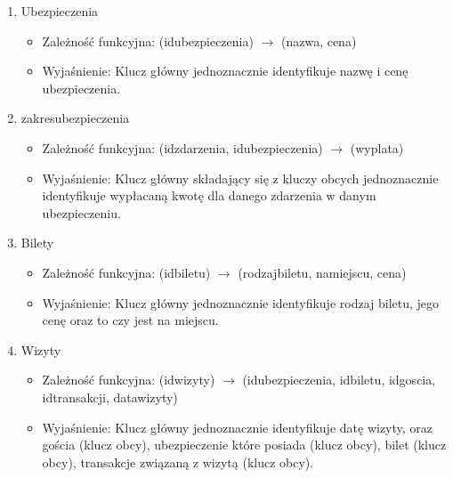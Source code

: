 \documentclass{article}
\begin{document}
\begin{enumerate}
\begin{itemize}
    Klucz główny jednoznacznie identyfikuje zdarzenie i jego prawdopodobieństwo wydarzenia.
\end{itemize}
\item Ubezpieczenia
\begin{itemize}
    \item Zależność funkcyjna: \newline
    (id\textunderscore ubezpieczenia) $\rightarrow$ (nazwa, cena)
    \item Wyjaśnienie: \newline
    Klucz główny jednoznacznie identyfikuje nazwę i cenę ubezpieczenia.
\end{itemize}
\item zakres\textunderscore ubezpieczenia 
\begin{itemize}
    \item Zależność funkcyjna: \newline
    (id\textunderscore zdarzenia, id\textunderscore ubezpieczenia) $\rightarrow$ (wyplata)
    \item Wyjaśnienie: \newline
    Klucz główny składający się z kluczy obcych jednoznacznie identyfikuje wypłacaną kwotę dla danego zdarzenia w danym ubezpieczeniu.
\end{itemize}
\item Bilety 
\begin{itemize}
    \item Zależność funkcyjna: \newline
    (id\textunderscore biletu) $\rightarrow$ (rodzaj\textunderscore biletu, na\textunderscore miejscu, cena)
    \item Wyjaśnienie: \newline
    Klucz główny jednoznacznie identyfikuje rodzaj biletu, jego cenę oraz to czy jest na miejscu.
\end{itemize}
\item Wizyty 
\begin{itemize}
    \item Zależność funkcyjna: \newline
    (id\textunderscore wizyty) $\rightarrow$ (id\textunderscore ubezpieczenia, id\textunderscore biletu, id\textunderscore goscia, id\textunderscore transakcji, data\textunderscore wizyty)
    \item Wyjaśnienie: \newline
    Klucz główny jednoznacznie identyfikuje datę wizyty, oraz gościa (klucz obcy), ubezpieczenie które posiada (klucz obcy), bilet (klucz obcy), transakcje związaną z wizytą (klucz obcy).

\end{itemize}
\end{enumerate}
\end{document}
